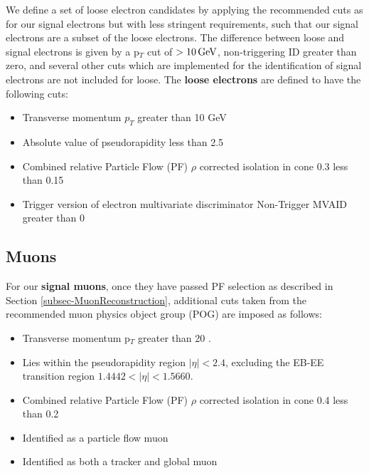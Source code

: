 We define a set of loose electron candidates by applying the recommended cuts as for our signal electrons but with less stringent requirements, such that our signal electrons are a subset of the loose electrons. The difference between loose and signal electrons is given by a p$_T$ cut of $> 10 \,\text{Ge\hspace{-.08em}V}$, non-triggering ID greater than zero, and several other cuts which are implemented for the identification of signal electrons are not included for loose. The \textbf{loose electrons} are defined to have the following cuts:

\begin{itemize}
	\item Transverse momentum $p_T$ greater than 10 GeV
	\item Absolute value of pseudorapidity less than 2.5
	\item Combined relative Particle Flow (PF) $\rho$ corrected isolation in cone 0.3 less than 0.15
	\item Trigger version of electron multivariate discriminator Non-Trigger MVAID greater than 0
\end{itemize}

\subsection{Muons}

For our \textbf{signal muons}, once they have passed PF selection as described in Section \ref{subsec-MuonReconstruction}, additional cuts taken from the recommended muon physics object group (POG) \cite{TOPMUO1} are imposed as follows:

\begin{itemize}
	\item Transverse momentum p$_T$ greater than 20 \GeV.
	\item Lies within the pseudorapidity region $|\eta| < 2.4$, excluding the EB-EE transition region $1.4442 < |\eta| < 1.5660$.
	\item Combined relative Particle Flow (PF) $\rho$ corrected isolation in cone 0.4 less than 0.2
	\item Identified as a particle flow muon
	\item Identified as both a tracker and global muon
\end{itemize}

